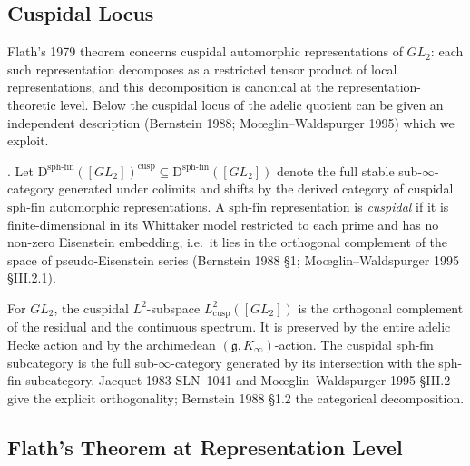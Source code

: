 \subsection{Cuspidal Locus}

Flath's 1979 theorem concerns cuspidal automorphic representations
of \(GL_{2}\): each such representation decomposes as a restricted
tensor product of local representations, and this decomposition is
canonical at the representation-theoretic level. Below the
cuspidal locus of the adelic quotient can be given an independent
description (Bernstein 1988; Mo{\oe}glin--Waldspurger 1995) which
we exploit.

\begin{definition}
\label{v4-arith:w5-e:def:cuspidal-sph-fin}
\ClaimStatusDefinitional. Let
\(\mathrm{D}^{\mathrm{sph\text{-}fin}}([GL_{2}])^{\mathrm{cusp}}\subseteq
\mathrm{D}^{\mathrm{sph\text{-}fin}}([GL_{2}])\)
denote the full stable sub-\(\infty\)-category generated under colimits
and shifts by the derived category of cuspidal
\(\mathrm{sph\text{-}fin}\) automorphic representations. A
\(\mathrm{sph\text{-}fin}\) representation is \emph{cuspidal} if it is
finite-dimensional in its Whittaker model restricted to each prime
and has no non-zero Eisenstein embedding, i.e.\ it lies in
the orthogonal complement of the space of pseudo-Eisenstein series
(Bernstein 1988 \S 1; Mo{\oe}glin--Waldspurger 1995 \S III.2.1).
\end{definition}

\begin{remark}
\label{v4-arith:w5-e:rem:cuspidal-orthogonality}
For \(GL_{2}\), the cuspidal \(L^{2}\)-subspace
\(L^{2}_{\mathrm{cusp}}([GL_{2}])\) is the orthogonal complement of the
residual and the continuous spectrum. It is preserved by the entire
adelic Hecke action and by the archimedean
\((\mathfrak{g},K_{\infty})\)-action. The cuspidal sph-fin subcategory
is the full sub-\(\infty\)-category generated by its intersection with
the sph-fin subcategory. Jacquet 1983 SLN~1041 and
Mo{\oe}glin--Waldspurger 1995 \S III.2 give the explicit
orthogonality; Bernstein 1988 \S 1.2 the categorical decomposition.
\end{remark}

\subsection{Flath's Theorem at Representation Level}

